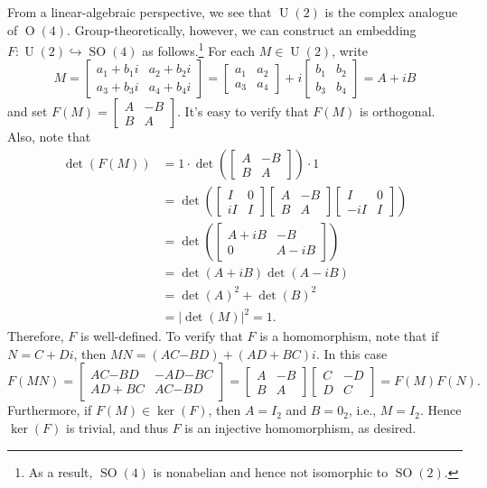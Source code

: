 \documentclass[10pt,letterpaper,cm]{nupset}
\theoremstyle{definition}
\theoremstyle{theorem}
\theoremstyle{remark}
\newcommand{\1}{\mathbf{1}}
\newcommand{\0}{\vec {0}}
\DeclareMathOperator{\ORT}{O}
\DeclareMathOperator{\SO}{SO}
\DeclareMathOperator{\U}{U}
\begin{document}
From a linear-algebraic perspective, we see that $\U(2)$ is the complex analogue of $\ORT(4)$. Group-theoretically, however, we can construct an embedding $F: \U(2) \hookrightarrow \SO(4)$ as follows.\footnote{As a result, $\SO(4)$ is nonabelian and hence not isomorphic to $\SO(2).$} For each $M\in \U(2)$, write $$M=\begin{bmatrix} a_1+b_1i & a_2+b_2i \\ a_3+b_3i & a_4+b_4i \end{bmatrix}=\begin{bmatrix} a_1 & a_2 \\ a_3 & a_4 \end{bmatrix} +i \begin{bmatrix} b_1 & b_2 \\ b_3 & b_4\end{bmatrix}=A+iB$$ and set $F(M)=\begin{bmatrix} A & {-B} \\ B & A\end{bmatrix}$. It's easy to verify that $F(M)$ is orthogonal.
Also, note that 
\begin{align*}
\det(F(M))& =1\cdot \det \left(\begin{bmatrix} A & {-B} \\ B & A\end{bmatrix} \right)\cdot 1
\\ & = \det \left(\begin{bmatrix} I & 0 \\ iI & I\end{bmatrix}\begin{bmatrix} A & {-B} \\ B & A\end{bmatrix}\begin{bmatrix} I & 0 \\ -iI & I\end{bmatrix} \right)
\\ & =\det \left(\begin{bmatrix} A +iB& {-B} \\ 0 & A-iB \end{bmatrix} \right)
\\ & =\det(A+iB)\det(A-iB)
\\ &= \det(A)^2 + \det(B)^2
\\ & =\left\lvert{\det(M)}\right\rvert^2=1
.
\end{align*} Therefore, $F$ is well-defined. 
To verify that $F$ is a homomorphism, note that if $N=C+Di$, then $MN=(AC{-B}D)+(AD+BC)i$. In this case $$F(MN)= \begin{bmatrix} A C{-BD} & {-A}D{-BC} \\ AD+BC & AC{-B}D\end{bmatrix}=\begin{bmatrix} A & {-B} \\ B & A\end{bmatrix}\begin{bmatrix} C & -D \\ D & C\end{bmatrix}=F(M)F(N).$$
Furthermore, if $F(M)\in \ker(F)$, then $A=I_2$ and $B=0_{2}$, i.e., $M=I_2$. Hence $\ker(F)$ is trivial, and thus $F$ is an injective homomorphism, as desired. 
\end{document}
